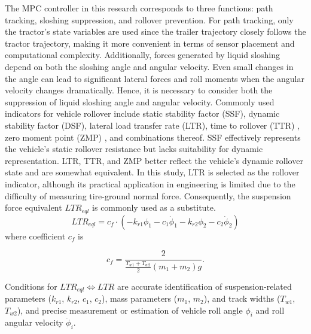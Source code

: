The MPC controller in this research corresponds to three functions: path tracking, sloshing suppression, and rollover prevention. For path tracking, only the tractor's state variables are used since the trailer trajectory closely follows the tractor trajectory, making it more convenient in terms of sensor placement and computational complexity. Additionally, forces generated by liquid sloshing depend on both the sloshing angle and angular velocity. Even small changes in the angle can lead to significant lateral forces and roll moments when the angular velocity changes dramatically. Hence, it is necessary to consider both the suppression of liquid sloshing angle and angular velocity. Commonly used indicators for vehicle rollover include static stability factor (SSF), dynamic stability factor (DSF), lateral load transfer rate (LTR), time to rollover (TTR) \cite{MPC_MotionPlanning2021}, zero moment point (ZMP) \cite{ZMP_2017}, and combinations thereof. SSF effectively represents the vehicle's static rollover resistance but lacks suitability for dynamic representation. LTR, TTR, and ZMP better reflect the vehicle's dynamic rollover state and are somewhat equivalent. In this study, LTR is selected as the rollover indicator, although its practical application in engineering is limited due to the difficulty of measuring tire-ground normal force. Consequently, the suspension force equivalent $LTR_{eql}$ is commonly used as a substitute.
\vspace{-0.3cm}
\begin{equation}
LTR_{eql} = c_f \cdot \left( -k_{r1}\phi_1 - c_1 \dot{\phi}_1 - k_{r2}\phi_2 - c_2 \dot{\phi}_2 \right)
\label{eq:LTR_eql}
\end{equation}
\vspace{-0.3cm}
where coefficient $c_f$ is 

\begin{equation}
c_f = \frac{2}{\frac{T_{w1} + T_{w2}}{2} (m_1 + m_2) g}.
\end{equation}

Conditions for $LTR_{eql}\Longleftrightarrow LTR$ are
	 accurate identification of suspension-related parameters ($k_{r1}$, $k_{r2}$, $c_1$, $c_2$), mass parameters ($m_1$, $m_2$), and track widths ($T_{w1}$, $T_{w2}$), and precise measurement or estimation of vehicle roll angle $\phi_i$ and roll angular velocity $\dot{\phi}_i$.

